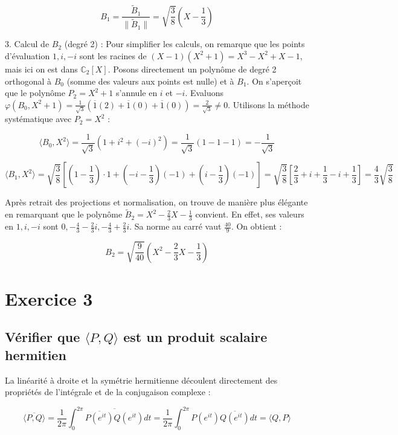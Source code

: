 \documentclass[french]{yLectureNote}
\begin{document}
$$B_1 = \frac{\tilde{B}_1}{\|\tilde{B}_1\|} = \sqrt{\frac{3}{8}}\left(X - \frac{1}{3}\right)$$


3. Calcul de $B_2$ (degré 2) :
Pour simplifier les calculs, on remarque que les points d'évaluation $1, i, -i$ sont les racines de $(X-1)(X^2+1) = X^3 - X^2 + X - 1$, mais ici on est dans $\mathbb{C}_2[X]$.
Posons directement un polynôme de degré 2 orthogonal à $B_0$ (somme des valeurs aux points est nulle) et à $B_1$. On s'aperçoit que le polynôme $P_2 = X^2 + 1$ s'annule en $i$ et $-i$.
Evaluons $\varphi(B_0, X^2+1) = \frac{1}{\sqrt{3}}(\overline{1}(2) + \overline{1}(0) + \overline{1}(0)) = \frac{2}{\sqrt{3}} \neq 0$.
Utilisons la méthode systématique avec $P_2 = X^2$ :

$$\langle B_0, X^2 \rangle = \frac{1}{\sqrt{3}}(1 + i^2 + (-i)^2) = \frac{1}{\sqrt{3}}(1 - 1 - 1) = -\frac{1}{\sqrt{3}}$$


$$\langle B_1, X^2 \rangle = \sqrt{\frac{3}{8}} \left[ \left(1-\frac{1}{3}\right)\cdot 1 + \left(-i-\frac{1}{3}\right)(-1) + \left(i-\frac{1}{3}\right)(-1) \right] = \sqrt{\frac{3}{8}} \left[ \frac{2}{3} + i + \frac{1}{3} - i + \frac{1}{3} \right] = \frac{4}{3}\sqrt{\frac{3}{8}}$$



Après retrait des projections et normalisation, on trouve de manière plus élégante en remarquant que le polynôme $\tilde{B}_2 = X^2 - \frac{2}{3}X - \frac{1}{3}$ convient.
En effet, ses valeurs en $1, i, -i$ sont $0, -\frac{4}{3}-\frac{2}{3}i, -\frac{4}{3}+\frac{2}{3}i$. Sa norme au carré vaut $\frac{40}{9}$.
On obtient :

$$B_2 = \sqrt{\frac{9}{40}}\left(X^2 - \frac{2}{3}X - \frac{1}{3}\right)$$

\section{Exercice 3}

\subsection{Vérifier que $\langle P,Q\rangle$ est un produit scalaire hermitien}

La linéarité à droite et la symétrie hermitienne découlent directement des propriétés de l'intégrale et de la conjugaison complexe :


$$\overline{\langle P,Q\rangle} = \frac{1}{2\pi}\int_{0}^{2\pi} \overline{\overline{P(e^{it})}Q(e^{it})} dt = \frac{1}{2\pi}\int_{0}^{2\pi} P(e^{it})\overline{Q(e^{it})} dt = \langle Q,P \rangle$$
\end{document}
